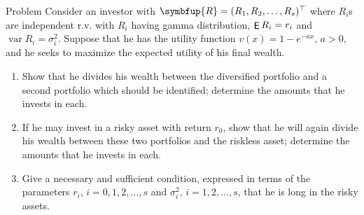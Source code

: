 \documentclass[10pt]{beamer}
\newcommand{\vR}{\symbfup{R}}
\DeclareMathOperator\expc{{\sf E}}
\DeclareMathOperator\var{var}
\theoremstyle{definition}
\begin{document}
\begin{frame}{Problem}
  Consider an investor with $\vR = (R_1, R_2, \ldots, R_s)^\top$ where $R_i$s are independent r.v. with $R_i$ having gamma distribution, $\expc{R_i} = r_i$ and $\var R_i = \sigma_i^2$. Suppose that he has the utility function $v(x) = 1 - e^{-ax}$, $a > 0$, and he seeks to maximize the expected utility of his final wealth. 
  \begin{enumerate}
    \item Show that he divides his wealth between the diversified portfolio and a second portfolio which should be identified; determine the amounts that he invests in each. 
    \item If he may invest in a risky asset with return $r_0$, show that he will again divide his wealth between these two portfolios and the riskless asset; determine the amounts that he invests in each. 
    \item Give a necessary and sufficient condition, expressed in terms of the parameters $r_i$, $i = 0, 1, 2, \ldots, s$ and $\sigma_i^2$, $i = 1, 2, \ldots, s$, that he is long in the risky assets.
  \end{enumerate}
\end{frame}
\end{document}
